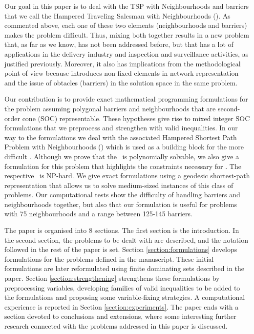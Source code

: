 \documentclass[a4paper,  review, authoryear, 1p., doubleblind]{elsarticle}
\newcommand{\SPPN}{{\sf{H-SPPN}\xspace }}
\newcommand{\TSPN}{{\sf{H-TSPN}\xspace }}
\begin{document}
	Our goal in this paper is to deal with the TSP with Neighbourhoods and barriers that we call the Hampered Traveling Salesman with Neighbourhoods (\TSPN ). As commented above, each one of these two elements (neighbourhoods and barriers) makes the problem difficult. Thus, mixing both together results in a new problem that, as far as we know, has not been addressed before, but that has a lot of applications in the delivery industry and inspection and surveillance activities, as justified previously. Moreover, it also has implications from the methodological point of view because introduces non-fixed elements in network representation and the issue of obtacles (barriers) in the solution space in the same problem.
	
	Our contribution is to provide exact mathematical programming formulations for the problem assuming polygonal barriers and neighbourhoods that are second-order cone (SOC) representable. These hypotheses give rise to mixed integer SOC formulations that we preprocess and strengthen with valid inequalities. In our way to the formulations we deal with the associated Hampered Shortest Path Problem with Neighbourhoods (\SPPN ) which is used as a building block for the more difficult \TSPN. Although we prove that the \SPPN \ is polynomially solvable, we also give a formulation for this problem that highlights the constraints necessary for \TSPN. The respective \TSPN \ is NP-hard. We give exact formulations using a geodesic shortest-path representation that allows us to solve medium-sized instances of this class of problems. Our computational tests show the difficulty of handling barriers and neighbourhoods together, but also that our formulation is useful for problems with 75 neighbourhoods and a range between 125-145 barriers.
	
	
	The paper is organised into 8 sections. The first section is the introduction. In the second section, the problems to be dealt with are described, and the notation followed in the rest of the paper is set. Section \ref{section:formulations} develops formulations for the problems defined in the manuscript. These initial formulations are later reformulated using finite dominating sets described in the paper.
	Section \ref{section:strengthening}  strengthens these formulations by preprocessing variables, developing families of valid inequalities to be added to the formulations and proposing some variable-fixing strategies. A computational experience is reported in Section \ref{section:experiments}. The paper ends with a section devoted to conclusions and extensions, where some interesting further research connected with the problems addressed in this paper is discussed.
	
\end{document}
